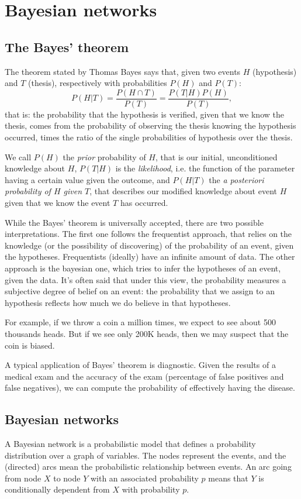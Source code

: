 \section{Bayesian networks}
\subsection{The Bayes' theorem}
The theorem stated by Thomas Bayes says that, given two events $H$ (hypothesis) and $T$ (thesis), respectively with probabilities $P(H)$ and $P(T)$:
\[ P(H|T) = \frac{P(H \cap T)}{P(T)} = \frac{P(T|H)P(H)}{P(T)}, \]
that is: the probability that the hypothesis is verified, given that we know the thesis, comes from the probability of observing the thesis knowing the hypothesis occurred, times the ratio of the single probabilities of hypothesis over the thesis.

We call $P(H)$ the \textit{prior} probability of $H$, that is our initial, unconditioned knowledge about $H$, $P(T|H)$ is the \textit{likelihood}, i.e. the function of the parameter having a certain value given the outcome, and $P(H|T)$ the \textit{a posteriori probability of $H$ given $T$}, that describes our modified knowledge about event $H$ given that we know the event $T$ has occurred.

While the Bayes' theorem is universally accepted, there are two possible interpretations. The first one follows the frequentist approach, that relies on the knowledge (or the possibility of discovering) of the probability of an event, given the hypotheses. Frequentists (ideally) have an infinite amount of data. The other approach is the bayesian one, which tries to infer the hypotheses of an event, given the data. It's often said that under this view, the probability measures a subjective degree of belief on an event: the probability that we assign to an hypothesis reflects how much we do believe in that hypotheses.

For example, if we throw a coin a million times, we expect to see about 500 thousands heads. But if we see only 200K heads, then we may suspect that the coin is biased.

A typical application of Bayes' theorem is diagnostic. Given the results of a medical exam and the accuracy of the exam (percentage of false positives and false negatives), we can compute the probability of effectively having the disease.

\subsection{Bayesian networks}
A Bayesian network is a probabilistic model that defines a probability distribution over a graph of variables. The nodes represent the events, and the (directed) arcs mean the probabilistic relationship between events. An arc going from node $X$ to node $Y$ with an associated probability $p$ means that $Y$ is conditionally dependent from $X$ with probability $p$.

